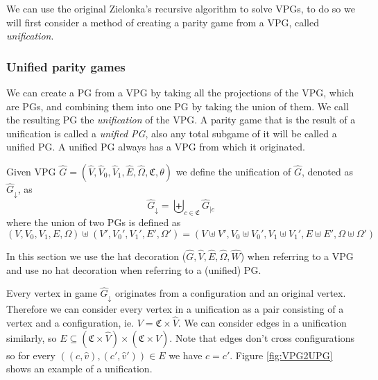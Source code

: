 We can use the original Zielonka's recursive algorithm to solve VPGs, to do so we will first consider a method of creating a parity game from a VPG, called \textit{unification}.
\subsubsection{Unified parity games}
We can create a PG from a VPG by taking all the projections of the VPG, which are PGs, and combining them into one PG by taking the union of them. We call the resulting PG the \textit{unification} of the VPG. A parity game that is the result of a unification is called a \textit{unified PG}, also any total subgame of it will be called a unified PG. A unified PG always has a VPG from which it originated.
\begin{definition}
	Given VPG $\hat{G} = (\hat{V},\hat{V}_0,\hat{V}_1, \hat{E},\hat{\Omega}, \mathfrak{C},\theta)$ we define the unification of $\hat{G}$, denoted as $\hat{G}_{\downarrow}$, as
	\[  \hat{G}_{\downarrow} = \biguplus_{c\in \mathfrak{C}}\hat{G}_{|c} \]
	where the union of two PGs is defined as
	\[ (V,V_0,V_1,E,\Omega) \uplus (V',V_0',V_1',E',\Omega') = (V \uplus V', V_0 \uplus V_0', V_1 \uplus V_1', E \uplus E', \Omega \uplus \Omega') \]
\end{definition}
In this section we use the hat decoration ($\hat{G},\hat{V},\hat{E},\hat{\Omega},\hat{W}$) when referring to a VPG and use no hat decoration when referring to a (unified) PG.

Every vertex in game $\hat{G}_{\downarrow}$ originates from a configuration and an original vertex. Therefore we can consider every vertex in a unification as a pair consisting of a vertex and a configuration, ie. $V = \mathfrak{C} \times \hat{V}$. We can consider edges in a unification similarly, so $E \subseteq (\mathfrak{C} \times \hat{V}) \times (\mathfrak{C} \times \hat{V})$. Note that edges don't cross configurations so for every $((c,\hat{v}) , (c',\hat{v}')) \in E$ we have $c = c'$. Figure \ref{fig:VPG2UPG} shows an example of a unification.


